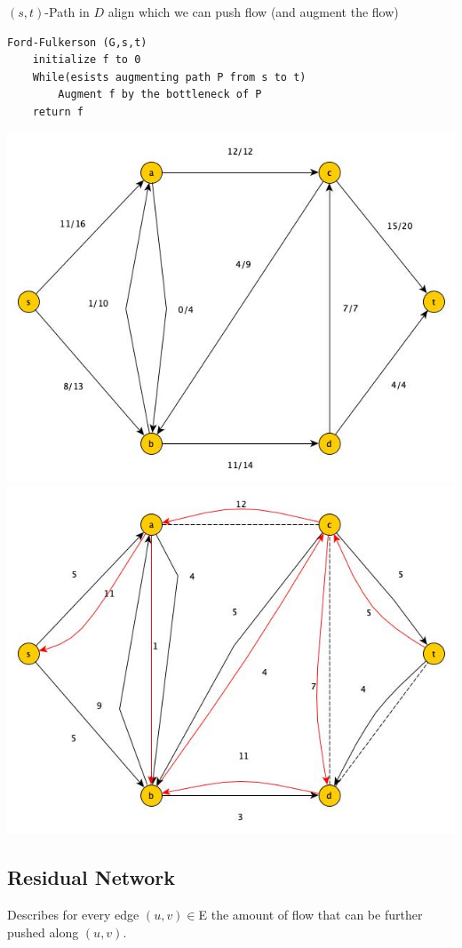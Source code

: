 $(s,t)$-Path in $D$ align which we can push flow (and augment the flow)

\begin{verbatim}
Ford-Fulkerson (G,s,t)
    initialize f to 0 
    While(esists augmenting path P from s to t)
        Augment f by the bottleneck of P
    return f
\end{verbatim}
\begin{center}
	\includegraphics[scale=0.5]{img/graph10}
	\includegraphics[scale=0.5]{img/graph11}
\end{center}

\subsection{Residual Network}
Describes for every edge $(u,v) \in $E the amount of flow that can be further pushed along $(u,v)$.

